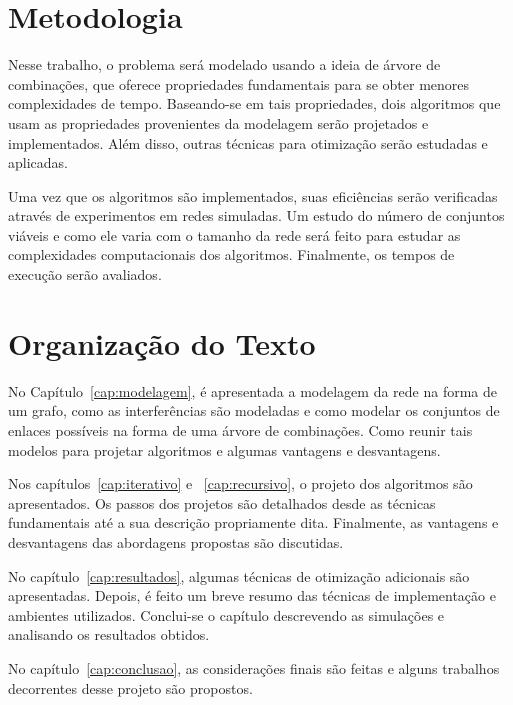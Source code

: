 \section{Metodologia}

Nesse trabalho, o problema será modelado usando a ideia de árvore de combinações, que oferece propriedades fundamentais para se obter menores complexidades de tempo. Baseando-se em tais propriedades, dois algoritmos que usam as propriedades provenientes da modelagem serão projetados e implementados. Além disso, outras técnicas para otimização serão estudadas e aplicadas.

Uma vez que os algoritmos são implementados, suas eficiências serão verificadas através de experimentos em redes simuladas. Um estudo do número de conjuntos viáveis e como ele varia com o tamanho da rede será feito para estudar as complexidades computacionais dos algoritmos. Finalmente, os tempos de execução serão avaliados.

\section{Organização do Texto}

No Capítulo~\ref{cap:modelagem}, é apresentada a modelagem da rede na forma de um grafo, como as interferências são modeladas e como modelar os conjuntos de enlaces possíveis na forma de uma árvore de combinações. Como reunir tais modelos para projetar algoritmos e algumas vantagens e desvantagens.

Nos capítulos~\ref{cap:iterativo} e ~\ref{cap:recursivo}, o projeto dos algoritmos são apresentados. Os passos dos projetos são detalhados desde as técnicas fundamentais até a sua descrição propriamente dita. Finalmente, as vantagens e desvantagens das abordagens propostas são discutidas.

No capítulo~\ref{cap:resultados}, algumas técnicas de otimização adicionais são apresentadas. Depois, é feito um breve resumo das técnicas de implementação e ambientes utilizados. Conclui-se o capítulo descrevendo as simulações e analisando os resultados obtidos.

No capítulo~\ref{cap:conclusao}, as considerações finais são feitas e alguns trabalhos decorrentes desse projeto são propostos.

